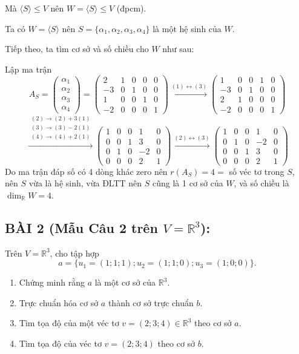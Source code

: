\documentclass[12pt,a4paper]{article}
\newcommand{\R}{\mathbb{R}}
\begin{document}
Mà $\langle S \rangle \le V$ nên $W = \langle S \rangle \le V$ (đpcm).

Ta có $W = \langle S \rangle$ nên $S = \{ \alpha_1, \alpha_2, \alpha_3, \alpha_4 \}$ là một hệ sinh của $W$.

Tiếp theo, ta tìm cơ sở và số chiều cho $W$ như sau:

Lập ma trận
\[
A_S = \begin{pmatrix} \alpha_1 \\ \alpha_2 \\ \alpha_3 \\ \alpha_4 \end{pmatrix} = 
\begin{pmatrix} 
2 & 1 & 0 & 0 & 0 \\ 
-3 & 0 & 1 & 0 & 0 \\ 
1 & 0 & 0 & 1 & 0 \\ 
-2 & 0 & 0 & 0 & 1 
\end{pmatrix}
\xrightarrow{(1) \leftrightarrow (3)}
\begin{pmatrix} 
1 & 0 & 0 & 1 & 0 \\ 
-3 & 0 & 1 & 0 & 0 \\ 
2 & 1 & 0 & 0 & 0 \\ 
-2 & 0 & 0 & 0 & 1 
\end{pmatrix}
\]
\[
\xrightarrow{\substack{(2) \to (2) + 3(1) \\ (3) \to (3) - 2(1) \\ (4) \to (4) + 2(1)}}
\begin{pmatrix} 
1 & 0 & 0 & 1 & 0 \\ 
0 & 0 & 1 & 3 & 0 \\ 
0 & 1 & 0 & -2 & 0 \\ 
0 & 0 & 0 & 2 & 1 
\end{pmatrix}
\xrightarrow{(2) \leftrightarrow (3)}
\begin{pmatrix} 
1 & 0 & 0 & 1 & 0 \\ 
0 & 1 & 0 & -2 & 0 \\ 
0 & 0 & 1 & 3 & 0 \\ 
0 & 0 & 0 & 2 & 1 
\end{pmatrix}
\]
Do ma trận đáp số có 4 dòng khác zero nên $r(A_S) = 4 = $ số véc tơ trong $S$, nên $S$ vừa là hệ sinh, vừa ĐLTT nên $S$ cũng là 1 cơ sở của $W$, và số chiều là $\dim_{\R} W = 4$.

\vspace{0.3cm}

\subsection*{BÀI 2 (Mẫu Câu 2 trên $V = \R^3$):}
Trên $V=\R^3$, cho tập hợp
\[
a=\{u_1=(1; 1; 1); u_2=(1; 1; 0); u_3=(1; 0; 0)\}.
\]
\begin{enumerate}[label=\alph*/,noitemsep]
\item Chứng minh rằng $a$ là một cơ sở của $\R^3$.
\item Trực chuẩn hóa cơ sở $a$ thành cơ sở trực chuẩn $b$.
\item Tìm tọa độ của một véc tơ $v=(2; 3; 4) \in \R^3$ theo cơ sở $a$.
\item Tìm tọa độ của véc tơ $v=(2; 3; 4)$ theo cơ sở $b$.
\end{enumerate}
\end{document}

